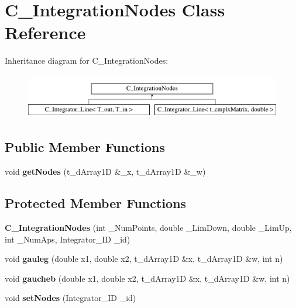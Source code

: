 \hypertarget{class_c___integration_nodes}{\section{C\-\_\-\-Integration\-Nodes Class Reference}
\label{class_c___integration_nodes}
}
Inheritance diagram for C\-\_\-\-Integration\-Nodes\-:\begin{figure}[H]
\begin{center}
\leavevmode
\includegraphics[height=2.000000cm]{class_c___integration_nodes}
\end{center}
\end{figure}
\subsection*{Public Member Functions}
\begin{DoxyCompactItemize}
\item 
\hypertarget{class_c___integration_nodes_ad63bb8d4226180ecf6332852a52b702b}{void {\bfseries get\-Nodes} (t\-\_\-d\-Array1\-D \&\-\_\-x, t\-\_\-d\-Array1\-D \&\-\_\-w)}\label{class_c___integration_nodes_ad63bb8d4226180ecf6332852a52b702b}

\end{DoxyCompactItemize}
\subsection*{Protected Member Functions}
\begin{DoxyCompactItemize}
\item 
\hypertarget{class_c___integration_nodes_aae608186412f531e84601f7681d9a5ba}{{\bfseries C\-\_\-\-Integration\-Nodes} (int \-\_\-\-Num\-Points, double \-\_\-\-Lim\-Down, double \-\_\-\-Lim\-Up, int \-\_\-\-Num\-Aps, Integrator\-\_\-\-I\-D \-\_\-id)}\label{class_c___integration_nodes_aae608186412f531e84601f7681d9a5ba}

\item 
\hypertarget{class_c___integration_nodes_a85fe5a11c29a8c59a75d5497901ca322}{void {\bfseries gauleg} (double x1, double x2, t\-\_\-d\-Array1\-D \&x, t\-\_\-d\-Array1\-D \&w, int n)}\label{class_c___integration_nodes_a85fe5a11c29a8c59a75d5497901ca322}

\item 
\hypertarget{class_c___integration_nodes_a551c1c98b67b3def0e59e65e3d515401}{void {\bfseries gaucheb} (double x1, double x2, t\-\_\-d\-Array1\-D \&x, t\-\_\-d\-Array1\-D \&w, int n)}\label{class_c___integration_nodes_a551c1c98b67b3def0e59e65e3d515401}

\item 
\hypertarget{class_c___integration_nodes_ac368475cac1e355e8a4ee4e3354888ae}{void {\bfseries set\-Nodes} (Integrator\-\_\-\-I\-D \-\_\-id)}\label{class_c___integration_nodes_ac368475cac1e355e8a4ee4e3354888ae}

\end{DoxyCompactItemize}
